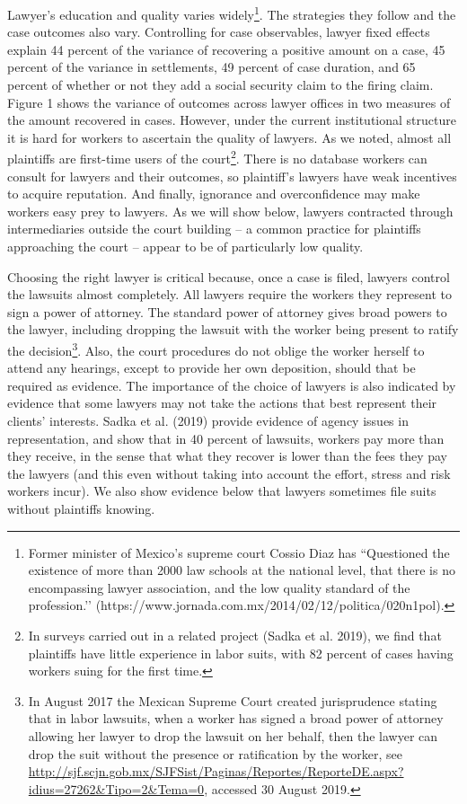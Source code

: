 \documentclass[12 pt]{article}
\begin{document}
Lawyer’s education and quality varies widely\footnote{Former minister of Mexico’s supreme court Cossio Diaz has “Questioned the existence of more than 2000 law schools at the national level, that there is no encompassing lawyer association, and the low quality standard of the profession.’’ (https://www.jornada.com.mx/2014/02/12/politica/020n1pol).}.  The strategies they follow and the case outcomes also vary. Controlling for case observables, lawyer fixed effects explain 44 percent of the variance of recovering a positive amount on a case, 45 percent of the variance in settlements, 49 percent of case duration, and 65 percent of whether or not they add a social security claim to the firing claim. Figure 1 shows the variance of outcomes across lawyer offices in two measures of the amount recovered in cases. However, under the current institutional structure it is hard for workers to ascertain the quality of lawyers. As we noted, almost all plaintiffs are first-time users of the court\footnote{In surveys carried out in a related project (Sadka et al. 2019), we find that plaintiffs have little experience in labor suits, with 82 percent of cases having workers suing for the first time.}.  There is no database workers can consult for lawyers and their outcomes, so plaintiff’s lawyers have weak incentives to acquire reputation. And finally, ignorance and overconfidence may make workers easy prey to lawyers. As we will show below, lawyers contracted through intermediaries outside the court building – a common practice for plaintiffs approaching the court – appear to be of particularly low quality.

Choosing the right lawyer is critical because, once a case is filed, lawyers control the lawsuits almost completely. All lawyers require the workers they represent to sign a power of attorney. The standard power of attorney gives broad powers to the lawyer, including dropping the lawsuit with the worker being present to ratify the decision\footnote{In August 2017 the Mexican Supreme Court created jurisprudence stating that in labor lawsuits, when a worker has signed a broad power of attorney allowing her lawyer to drop the lawsuit on her behalf, then the lawyer can drop the suit without the presence or ratification by the worker, see \url{http://sjf.scjn.gob.mx/SJFSist/Paginas/Reportes/ReporteDE.aspx?idius=27262&Tipo=2&Tema=0}, accessed 30 August 2019.}.  Also, the court procedures do not oblige the worker herself to attend any hearings, except to provide her own deposition, should that be required as evidence. The importance of the choice of lawyers is also indicated by evidence that some lawyers may not take the actions that best represent their clients’ interests. Sadka et al. (2019) provide evidence of agency issues in representation, and show that in 40 percent of lawsuits, workers pay more than they receive, in the sense that what they recover is lower than the fees they pay the lawyers (and this even without taking into account the effort, stress and risk workers incur). We also show evidence below that lawyers sometimes file suits without plaintiffs knowing. 
\end{document}
